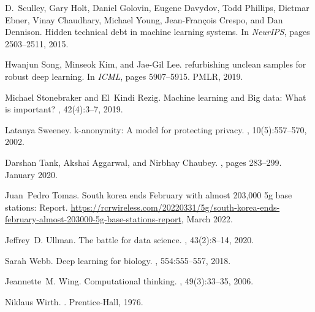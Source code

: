 \documentclass[11pt]{article}
\begin{document}
\begin{thebibliography}{10}
D.~Sculley, Gary Holt, Daniel Golovin, Eugene Davydov, Todd Phillips, Dietmar
  Ebner, Vinay Chaudhary, Michael Young, Jean{-}Fran{\c{c}}ois Crespo, and Dan
  Dennison.
\newblock Hidden technical debt in machine learning systems.
\newblock In {\em NeurIPS}, pages 2503--2511, 2015.

Hwanjun Song, Minseok Kim, and Jae{-}Gil Lee.
 refurbishing unclean samples for robust deep learning.
\newblock In {\em ICML}, pages 5907--5915. {PMLR}, 2019.

Michael Stonebraker and El~Kindi Rezig.
\newblock Machine learning and {B}ig data: What is important?
, 42(4):3--7, 2019.

Latanya Sweeney.
\newblock k-anonymity: A model for protecting privacy.
,
  10(5):557--570, 2002.

Darshan Tank, Akshai Aggarwal, and Nirbhay Chaubey.
, pages
  283--299.
\newblock January 2020.

Juan~Pedro Tomas.
\newblock South korea ends {F}ebruary with almost 203,000 5g base stations:
  Report.
\newblock
  \url{https://rcrwireless.com/20220331/5g/south-korea-ends-february-almost-203000-5g-base-stations-report},
  March 2022.

Jeffrey~D. Ullman.
\newblock The battle for data science.
, 43(2):8--14, 2020.

Sarah Webb.
\newblock Deep learning for biology.
, 554:555--557, 2018.

Jeannette~M. Wing.
\newblock Computational thinking.
, 49(3):33--35, 2006.

Niklaus Wirth.
.
\newblock Prentice-Hall, 1976.

\end{thebibliography}
\end{document}
